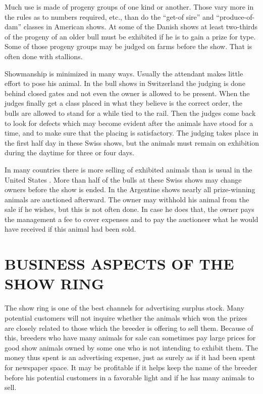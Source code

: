 Much use is made of progeny groups of one kind or another. Those
vary more in the rules as to numbers required, etc., than do the ``get-of sire''
and ``produce-of-dam'' classes in American shows. At some of the
Danish shows at least two-thirds of the progeny of an older bull must be
exhibited if he is to gain a prize for type. Some of those progeny groups
may be judged on farms before the show. That is often done with
stallions.

Showmanship is minimized in many ways. Usually the attendant
makes little effort to pose his animal. In the bull shows in Switzerland
the judging is done behind closed gates and not even the owner is
allowed to be present. When the judges finally get a class placed in
what they believe is the correct order, the bulls are allowed to stand
for a while tied to the rail. Then the judges come back to look for
defects which may become evident after the animals have stood for a
time, and to make sure that the placing is satisfactory. The judging
takes place in the first half day in these Swiss shows, but the animals
must remain on exhibition during the daytime for three or four days.

In many countries there is more selling of exhibited animals than is
usual in the United States . More than half of the bulls at these Swiss
shows may change owners before the show is ended. In the Argentine
shows nearly all prize-winning animals are auctioned afterward. The
owner may withhold his animal from the sale if he wishes, but this is
not often done. In case he does that, the owner pays the management a
fee to cover expenses and to pay the auctioneer what he would have
received if this animal had been sold.

\section*{BUSINESS ASPECTS OF THE SHOW RING}

The show ring is one of the best channels for advertising surplus
stock. Many potential customers will not inquire whether the animals
which won the prizes are closely related to those which the breeder is
offering to sell them. Because of this, breeders who have many animals
for sale can sometimes pay large prices for good show animals owned by
some one who is not intending to exhibit them. The money thus spent
is an advertising expense, just as surely as if it had been spent for newspaper
space. It may be profitable if it helps keep the name of the
breeder before his potential customers in a favorable light and if he has
many animals to sell.

